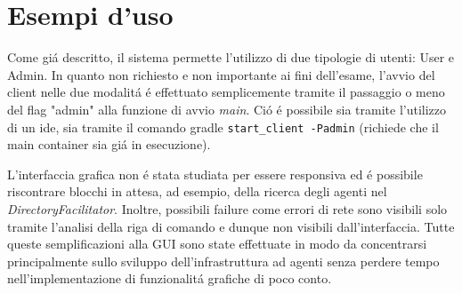 \section{Esempi d’uso}


Come gi\'a descritto, il sistema permette l'utilizzo di due tipologie di utenti: User e Admin. In quanto non richiesto e non importante ai fini dell'esame, l'avvio del client nelle due modalit\'a \'e effettuato semplicemente tramite il passaggio o meno del flag "admin" alla funzione di avvio \textit{main}. Ci\'o \'e possibile sia tramite l'utilizzo di un ide, sia tramite il comando gradle \texttt{start\_client -Padmin} (richiede che il main container sia gi\'a in esecuzione).

L'interfaccia grafica non \'e stata studiata per essere responsiva ed \'e possibile riscontrare blocchi in attesa, ad esempio, della ricerca degli agenti nel \textit{DirectoryFacilitator}. Inoltre, possibili failure come errori di rete sono visibili solo tramite l'analisi della riga di comando e dunque non visibili dall'interfaccia. Tutte queste semplificazioni alla GUI sono state effettuate in modo da concentrarsi principalmente sullo sviluppo dell'infrastruttura ad agenti senza perdere tempo nell'implementazione di funzionalit\'a grafiche di poco conto.


